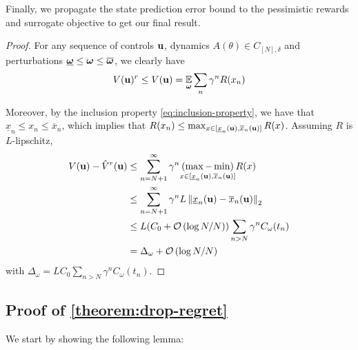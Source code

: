 \documentclass{article}
\begin{document}
Finally, we propagate the state prediction error bound to the pessimistic rewards and surrogate objective to get our final result.
\begin{proof}
  
 For any sequence of controls $\mathbf{u}$, dynamics $A(\theta)\in C_{[N],\delta}$ and perturbations $\underline{\bm{\omega}} \leq \bm{\omega} \leq \overline{\bm{\omega}}$, we clearly have 
 \[V(\mathbf{u})^r \leq V(\mathbf{u}) = \operatorname*{\mathbb{E}}_{\bm{\omega}}\sum_n \gamma^n R(x_n)\]
 
 Moreover, by the inclusion property \eqref{eq:inclusion-property}, we have that $\underline{x}_n \leq x_n \leq \overline{x}_n$, which implies that $R(x_n) \leq \max_{x\in[\underline{x}_n(\mathbf{u}), \overline{x}_n(\mathbf{u})]}  R(x)$. Assuming $R$ is $L$-lipschitz,
 \begin{align*}
     V(\mathbf{u}) - \hat{V}^r(\mathbf{u}) &\leq \sum_{n=N+1}^\infty \gamma^n \underset{{x\in[\underline{x}_n(\mathbf{u}), \overline{x}_n(\mathbf{u})]}}{(\max - \min)} R(x)\\
     &\leq \sum_{n=N+1}^\infty \gamma^n L \left\|\underline{x}_n(\mathbf{u}) - \overline{x}_n(\mathbf{u})\right\|_2\\
     &\leq L(C_0 + \mathcal{O}\left({\log N / N}\right)) \sum_{n>N} \gamma^n C_{\omega}(t_n)\\
     &= \Delta_\omega + \mathcal{O}\left({\log N / N}\right)
 \end{align*}
 with $\Delta_\omega = L C_0\sum_{n>N} \gamma^n C_{\omega}(t_n)$.
\end{proof}


\subsection{Proof of \autoref{theorem:drop-regret}}

We start by showing the following lemma:
\end{document}

